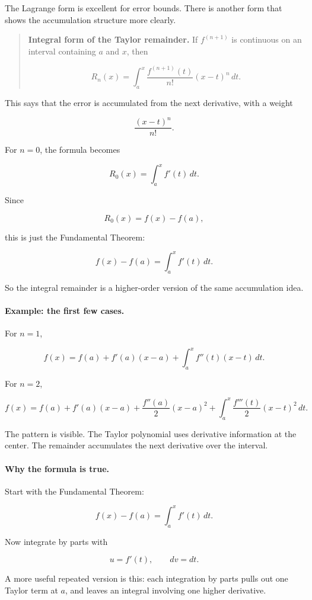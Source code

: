 The Lagrange form is excellent for error bounds.  There is another form that shows the
accumulation structure more clearly.

\begin{quote}
\textbf{Integral form of the Taylor remainder.}
If \(f^{(n+1)}\) is continuous on an interval containing \(a\) and \(x\), then

\[
\boxed{
R_n(x)=
\int_a^x
\frac{f^{(n+1)}(t)}{n!}(x-t)^n\,dt.
}
\]
\end{quote}

This says that the error is accumulated from the next derivative, with a weight

\[
\frac{(x-t)^n}{n!}.
\]

For \(n=0\), the formula becomes

\[
R_0(x)=\int_a^x f'(t)\,dt.
\]

Since

\[
R_0(x)=f(x)-f(a),
\]

this is just the Fundamental Theorem:

\[
f(x)-f(a)=\int_a^x f'(t)\,dt.
\]

So the integral remainder is a higher-order version of the same accumulation idea.

\paragraph{Example: the first few cases.}
For \(n=1\),

\[
f(x)=f(a)+f'(a)(x-a)+\int_a^x f''(t)(x-t)\,dt.
\]

For \(n=2\),

\[
f(x)=f(a)+f'(a)(x-a)+\frac{f''(a)}{2}(x-a)^2
+\int_a^x \frac{f'''(t)}{2}(x-t)^2\,dt.
\]

The pattern is visible.  The Taylor polynomial uses derivative information at the center.
The remainder accumulates the next derivative over the interval.

\paragraph{Why the formula is true.}
Start with the Fundamental Theorem:

\[
f(x)-f(a)=\int_a^x f'(t)\,dt.
\]

Now integrate by parts with

\[
u=f'(t),
\qquad
dv=dt.
\]

A more useful repeated version is this: each integration by parts pulls out one Taylor
term at \(a\), and leaves an integral involving one higher derivative.

